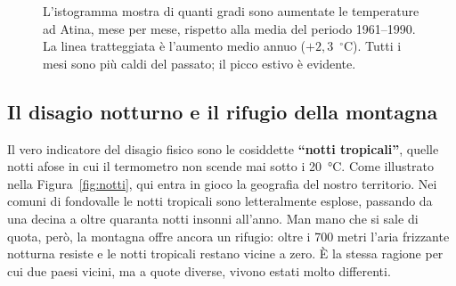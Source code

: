 \documentclass[11pt,a4paper]{article}
\newcommand{\gradi}{$^{\circ}$C}
\begin{document}
\begin{figure}[H]
\centering
{}
\caption{L'istogramma mostra di quanti gradi sono aumentate le temperature ad Atina, mese per mese, rispetto alla media del periodo 1961--1990. La linea tratteggiata è l'aumento medio annuo ($+2{,}3$~\gradi). Tutti i mesi sono più caldi del passato; il picco estivo è evidente.}
\label{fig:atina}
\end{figure}

\subsection{Il disagio notturno e il rifugio della montagna}
Il vero indicatore del disagio fisico sono le cosiddette \textbf{``notti tropicali''}, quelle notti afose in cui il termometro non scende mai sotto i \SI{20}{\celsius}. Come illustrato nella Figura~\ref{fig:notti}, qui entra in gioco la geografia del nostro territorio. Nei comuni di fondovalle le notti tropicali sono letteralmente esplose, passando da una decina a oltre quaranta notti insonni all'anno. Man mano che si sale di quota, però, la montagna offre ancora un rifugio: oltre i 700 metri l'aria frizzante notturna resiste e le notti tropicali restano vicine a zero. È la stessa ragione per cui due paesi vicini, ma a quote diverse, vivono estati molto differenti.
\end{document}
